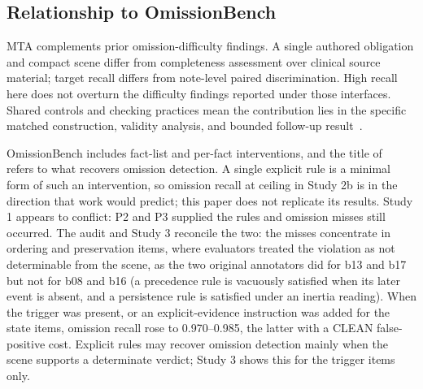 \documentclass{ieeeaccess}
\begin{document}
\subsection{Relationship to OmissionBench}
MTA complements prior omission-difficulty findings. A single authored obligation and compact scene differ from completeness assessment over clinical source material; target recall differs from note-level paired discrimination. High recall here does not overturn the difficulty findings reported under those interfaces. Shared controls and checking practices mean the contribution lies in the specific matched construction, validity analysis, and bounded follow-up result~\cite{fox2026omission,omissionbench2026,omissionsoftware}.

OmissionBench includes fact-list and per-fact interventions, and the title of~\cite{fox2026omission} refers to what recovers omission detection. A single explicit rule is a minimal form of such an intervention, so omission recall at ceiling in Study 2b is in the direction that work would predict; this paper does not replicate its results. Study 1 appears to conflict: P2 and P3 supplied the rules and omission misses still occurred. The audit and Study 3 reconcile the two: the misses concentrate in ordering and preservation items, where evaluators treated the violation as not determinable from the scene, as the two original annotators did for b13 and b17 but not for b08 and b16 (a precedence rule is vacuously satisfied when its later event is absent, and a persistence rule is satisfied under an inertia reading). When the trigger was present, or an explicit-evidence instruction was added for the state items, omission recall rose to 0.970--0.985, the latter with a CLEAN false-positive cost. Explicit rules may recover omission detection mainly when the scene supports a determinate verdict; Study 3 shows this for the trigger items only.
\end{document}

